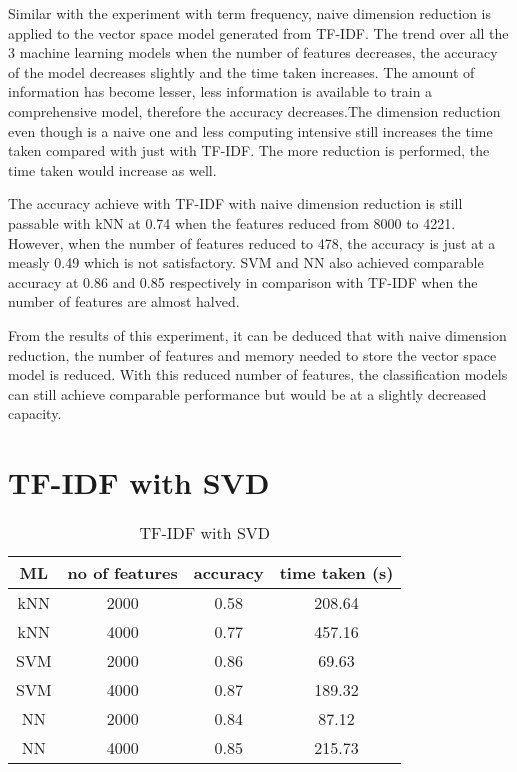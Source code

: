 Similar with the experiment with term frequency, naive dimension reduction is applied to the vector space model generated from TF-IDF. The trend over all the 3 machine learning models when the number of features decreases, the accuracy of the model decreases slightly and the time taken increases. The amount of information has become lesser, less information is available to train a comprehensive model, therefore the accuracy decreases.The dimension reduction even though is a naive one and less computing intensive still increases the time taken compared with just with TF-IDF. The more reduction is performed, the time taken would increase as well.

The accuracy achieve with TF-IDF with naive dimension reduction is still passable with kNN at 0.74 when the features reduced from 8000 to 4221. However, when the number of features reduced to 478, the accuracy is just at a measly 0.49 which is not satisfactory. SVM and NN also achieved comparable accuracy at 0.86 and 0.85 respectively in comparison with TF-IDF when the number of features are almost halved.

From the results of this experiment, it can be deduced that with naive dimension reduction, the number of features and memory needed to store the vector space model is reduced. With this reduced number of features, the classification models can still achieve comparable performance but would be at a slightly decreased capacity.

\section{TF-IDF with SVD}

\begin{table} [ht]
	\centering
	\begin{tabular}{|| c | c | c | c||}
		\hline
		ML & no of features & accuracy & time taken (s) \\ [0.5ex]
		\hline\hline
		kNN & 2000 & 0.58 & 208.64 \\ 
		\hline
		kNN & 4000 & 0.77 & 457.16 \\
		\hline\hline
		SVM & 2000 & 0.86 & 69.63 \\
		\hline
		SVM & 4000 & 0.87 & 189.32 \\
		\hline\hline
		NN & 2000 & 0.84 & 87.12 \\
		\hline
		NN & 4000 & 0.85 & 215.73 \\
		\hline\hline
	\end{tabular}
\caption{TF-IDF with SVD}
\label{tbl:tfidfSvd}
\end{table}

